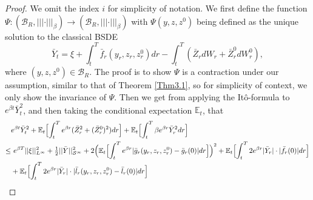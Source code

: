 \documentclass[10pt,a4paper]{article}
\newcommand{\E}{\mathbb{E}}
\theoremstyle{plain}
\theoremstyle{definition}
\numberwithin{equation}{section}
\newcommand{\trinm}[1]{\vert\!\vert\!\vert #1 \vert\!\vert\!\vert}
\begin{document}
\begin{proof}
    

We omit the index $i$ for simplicity of notation. We first define the function $\Psi: (\mathcal{B}_{R}, \trinm{\cdot}_{\beta} ) \rightarrow (\mathcal{B}_{R},\trinm{\cdot}_{\beta})$ with $\Psi(y,z,z^{0})$ being defined as the unique solution to the classical BSDE
\begin{equation}
\label{equ:gMF.2}
\bar{Y}_{t} = \xi + \int_{t}^{T}\bar{f}_{r}(y_{r},z_{r},z_{r}^{0})dr - \int_{t}^{T}(\bar{Z}_{r}dW_{r}+\bar{Z}_{r}^{0}dW_{r}^{0}),
\end{equation}
where $(y,z,z^{0}) \in \mathcal{B}_{R}$. The proof is to show $\Psi $ is a contraction under our assumption, similar to that of Theorem \ref{Thm3.1}, so for simplicity of context, we only 
show the invariance of $\Psi.$ Then we get from applying the It\^o-formula to $e^{\beta t}\bar{Y}_{t}^{2}$, and then taking the conditional expectation $\E_t$, that 
\begin{align}
&e^{\beta t}\bar{Y}_{t}^{2} + \mathbb{E}_{t}\Bigl[\int_{t}^{T}e^{\beta r}(\bar{Z}_{r}^{2}+(\bar{Z}_{r}^{0})^{2})dr\Bigr] + \mathbb{E}_{t}\Bigl[\int_{t}^{T}\beta e^{\beta r}\bar{Y}_{r}^{2}dr\Bigr]\nonumber \\
\leq & \ e^{\beta T}||\xi||_{L^{\infty}}^{2} + \tfrac{1}{2}||\bar{Y}||_{\mathcal{S}^{\infty}}^{2} + 2\Bigl(\mathbb{E}_{t}\Bigl[\int_{t}^{T}e^{\beta r}|\bar{g}_{r}(y_{r},z_{r},z_{r}^{0})-\bar{g}_{r}(0)|dr\Bigr]\Bigr)^{2} + \mathbb{E}_{t}\Bigl[\int_{t}^{T}2e^{\beta r}|\bar{Y}_{r}|\cdot |\bar{f}_{r}(0)|dr\Bigr] \nonumber \\
& + \mathbb{E}_{t}\Bigl[\int_{t}^{T}2e^{\beta r}|\bar{Y}_{r}|\cdot|\bar{l}_{r}(y_{r},z_{r},z_{r}^{0})-\bar{l}_{r}(0)|dr\Bigr] \nonumber \\

\end{align}
\end{proof}
\end{document}

